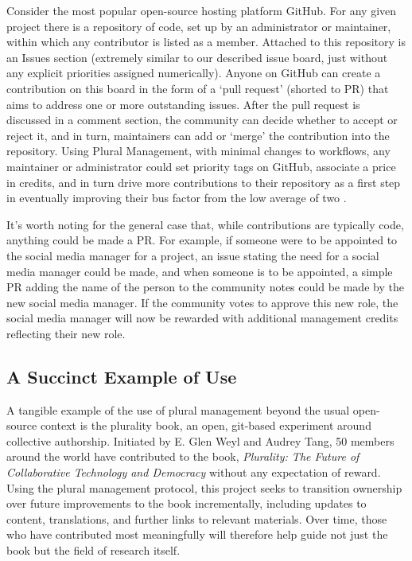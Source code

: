 \documentclass{article}
\begin{document}
Consider the most popular open-source hosting platform GitHub. For any given project there is a repository of code, set up by an administrator or maintainer, within which any contributor is listed as a member. Attached to this repository is an Issues section (extremely similar to our described issue board, just without any explicit priorities assigned numerically). Anyone on GitHub can create a contribution on this board in the form of a `pull request' (shorted to PR) that aims to address one or more outstanding issues. After the pull request is discussed in a comment section, the community can decide whether to accept or reject it, and in turn, maintainers can add or `merge' the contribution into the repository. Using Plural Management, with minimal changes to workflows, any maintainer or administrator could set priority tags on GitHub, associate a price in credits, and in turn drive more contributions to their repository as a first step in eventually improving their bus factor from the low average of two \cite{metabase2022bus}.

It's worth noting for the general case that, while contributions are typically code, anything could be made a PR. For example, if someone were to be appointed to the social media manager for a project, an issue stating the need for a social media manager could be made, and when someone is to be appointed, a simple PR adding the name of the person to the community notes could be made by the new social media manager. If the community votes to approve this new role, the social media manager will now be rewarded with additional management credits reflecting their new role.

\subsection{A Succinct Example of Use}
A tangible example of the use of plural management beyond the usual open-source context is the plurality book, an open, git-based experiment around collective authorship. Initiated by E. Glen Weyl and Audrey Tang, 50 members around the world have contributed to the book, \textit{Plurality: The Future of Collaborative Technology and Democracy} without any expectation of reward. Using the plural management protocol, this project seeks to transition ownership over future improvements to the book incrementally, including updates to content, translations, and further links to relevant materials. Over time, those who have contributed most meaningfully will therefore help guide not just the book but the field of research itself.
\end{document}
